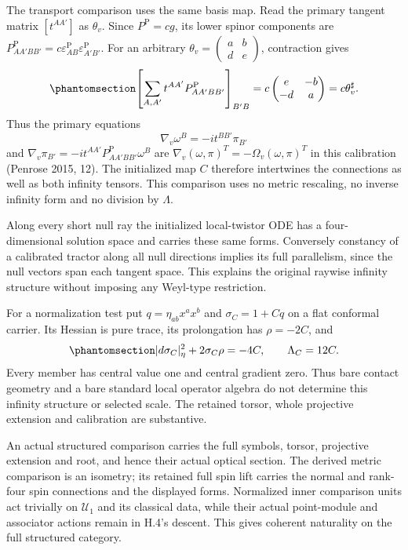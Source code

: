 \documentclass[
  english,
  11pt,
  reqno]{amsart}
\begin{document}
The transport comparison uses the same basis map. Read the primary
tangent matrix \([t^{AA'}]\) as \(\theta_v\). Since
\(P^{\mathrm P}=cg\), its lower spinor components are
\(P^{\mathrm P}_{AA'BB'}=c\varepsilon^{\mathrm P}_{AB}\varepsilon^{\mathrm P}_{A'B'}\).
For an arbitrary
\(\theta_v=\left(\begin{smallmatrix}a&b\\d&e\end{smallmatrix}\right)\),
contraction gives
\begin{equation}\protect\phantomsection\label{eq:gg-original-infinity-external-transport}{
 \left[
  \sum_{A,A'}t^{AA'}P^{\mathrm P}_{AA'BB'}
 \right]_{B'B}
   =c\begin{pmatrix}e&-b\\-d&a\end{pmatrix}
   =c\theta_v^\sharp .
}\end{equation} Thus the primary equations
\[\nabla_v\omega^B=-it^{BB'}\pi_{B'}\] and
\(\nabla_v\pi_{B'}=\allowbreak-it^{AA'}P^{\mathrm P}_{AA'BB'}\omega^B\) are
\(\nabla_v(\omega,\pi)^T=\allowbreak-\Omega_v(\omega,\pi)^T\) in this calibration
(Penrose 2015, 12). The initialized map \(C\) therefore intertwines the
connections as well as both infinity tensors. This comparison uses no
metric rescaling, no inverse infinity form and no division by
\(\Lambda\).

Along every short null ray the initialized local-twistor ODE has a
four-dimensional solution space and carries these same forms. Conversely
constancy of a calibrated tractor along all null directions implies its
full parallelism, since the null vectors span each tangent space. This
explains the original raywise infinity structure without imposing any
Weyl-type restriction.

For a normalization test put \(q=\eta_{ab}x^ax^b\) and \(\sigma_C=1+Cq\)
on a flat conformal carrier. Its Hessian is pure trace, its prolongation
has \(\rho=-2C\), and
\begin{equation}\protect\phantomsection\label{eq:gg-original-infinity-scale-test}{
 |d\sigma_C|_\eta^2+2\sigma_C\rho=-4C,
 \qquad \Lambda_C=12C .
}\end{equation} Every member has central value one and central gradient
zero. Thus bare contact geometry and a bare standard local operator
algebra do not determine this infinity structure or selected scale. The
retained torsor, whole projective extension and calibration are
substantive.

An actual structured comparison carries the full symbols, torsor,
projective extension and root, and hence their actual optical section.
The derived metric comparison is an isometry; its retained full spin
lift carries the normal and rank-four spin connections and the displayed
forms. Normalized inner comparison units act trivially on
\(\mathscr U_1\) and its classical data, while their actual point-module
and associator actions remain in H.4's descent. This gives coherent
naturality on the full structured category.
\end{document}
